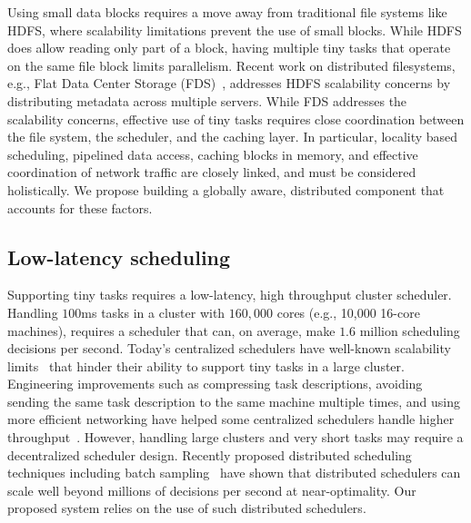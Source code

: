 Using small data blocks requires a move away from traditional file systems like
HDFS, where scalability limitations prevent the use of small blocks.
While HDFS does allow reading only part of a block, having multiple tiny tasks
that operate on the same file block limits parallelism.
Recent work on distributed filesystems, e.g., Flat Data Center
Storage (FDS)~\cite{nightingale2012flat}, addresses HDFS scalability concerns by
distributing metadata across multiple servers. While FDS addresses the scalability
concerns, effective use of tiny tasks requires close coordination between the file
system, the scheduler, and the caching layer.
In particular, locality based scheduling, pipelined data access, caching blocks in 
memory, and effective coordination of network traffic are closely linked, and 
must be considered holistically. We propose building a globally aware, distributed
component that accounts for these factors.



\subsection{Low-latency scheduling}
Supporting tiny tasks requires a low-latency, high throughput cluster scheduler.
Handling $100$ms tasks in a cluster with $160,000$ cores
(e.g., 10,000 16-core machines),
requires a scheduler that can, on average, make $1.6$ million scheduling
decisions per second.
Today's centralized schedulers have well-known scalability
limits~\cite{wilkesberkeley} that
hinder their ability to support tiny tasks in a large cluster.
Engineering improvements such as compressing task descriptions,
avoiding sending the same task description to the same machine multiple
times, and using more efficient networking have helped some
centralized schedulers
handle higher throughput~\cite{zaharia2012meetup}.
However, handling large clusters and very
short tasks may require a decentralized scheduler design.
Recently proposed distributed scheduling techniques including batch
sampling~\cite{ousterhoutbatch} have shown that distributed schedulers
can scale well beyond millions of decisions per second at near-optimality.
Our proposed system relies on the use of such distributed schedulers.

